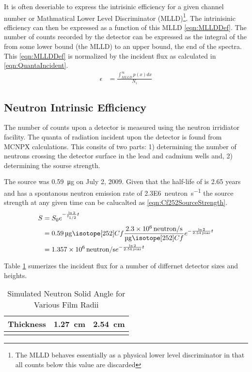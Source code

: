 \documentclass[draftcls,onecolumn]{IEEEtran}
\begin{document}
It is often deseriable to express the intrisinic efficiency for a given channel number or Mathmatical Lower Level Discriminator (MLLD)\footnote{The MLLD behaves essentially as a physical lower level discriminator in that all counts below this value are discarded}.
The intrinisinic efficiency can then be expressed as a function of this MLLD \eqref{eqn:MLLDDef}.
The number of counts recorded by the detector can be expressed as the integral of the  from some lower bound (the MLLD) to an upper bound, the end of the spectra.
This \eqref{eqn:MLLDDef} is normalized by the incident flux as calculated in \eqref{eqn:QuantaIncident}.
\begin{align}
	\label{eqn:MLLDDef}
	\epsilon &= \frac{\int_{MLLD}^\infty p(x)dx}{N_i}
\end{align}

\subsection{Neutron Intrinsic Efficiency}
The number of counts upon a detector is measured using the neutron irridiator facility.
The quanta of radiation incident upon the detector is found from MCNPX calculations.
This consits of two parts: 1) determining the number of neutrons crossing the detector surface in the lead and cadmium wells and, 2) determining the sourse strength.

The  source was \SI{0.59}{\ug} on July 2, 2009.
Given that the half-life of  is 2.65 years and  has a spontanous neutron emission rate of \SI{2.3E6}{neutron\per\second} the source strength at any given time can be calucalted as \eqref{eqn:Cf252SourceStrength}.
\begin{align}
  \label{eqn:Cf252SourceStrength}
  S &= S_0 e^{-\frac{\ln{2}}{t_{1/2}} t} \\ \notag 
    &= \SI{0.59}{\ug} \iso[252]{Cf} \frac{\SI{2.3E6}{neutron\per\second}}{\si{\ug} \iso[252]{Cf}} e^{-\frac{ \ln{2}}{\SI{2.54}{year}}t}  \\ \notag
    &= \SI{1.357E6}{neutron\per\second} e^{-\frac{ \ln{2}}{\SI{2.54}{year}}t} 
\end{align}

Table \ref{tab:NeutronSolidAngle} sumerizes the incident flux for a number of differnet detector sizes and heights.

\begin{table}
	\centering
	\caption{Simulated Neutron Solid Angle for Various Film Radii}
	\label{tab:NeutronSolidAngle}
	\begin{tabular}{c | c c}
 		Thickness & \SI{1.27}{\cm} & \SI{2.54}{\cm} \\ \hline
		& & 
	\end{tabular}
\end{table}
\end{document}
